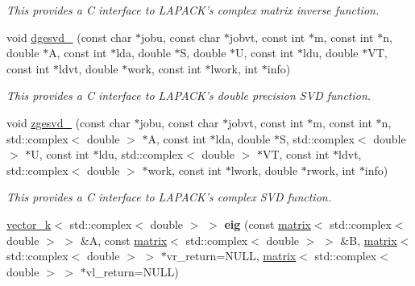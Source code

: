 \begin{DoxyCompactItemize}
\begin{DoxyCompactList}\small\item\em This provides a C interface to L\-A\-P\-A\-C\-K's complex matrix inverse function. \end{DoxyCompactList}\item 
\hypertarget{namespacekeycpp_a8fe7a71afbb6c5dc049cdd7afff6c0af}{void \hyperlink{namespacekeycpp_a8fe7a71afbb6c5dc049cdd7afff6c0af}{dgesvd\-\_\-} (const char $\ast$jobu, const char $\ast$jobvt, const int $\ast$m, const int $\ast$n, double $\ast$A, const int $\ast$lda, double $\ast$S, double $\ast$U, const int $\ast$ldu, double $\ast$V\-T, const int $\ast$ldvt, double $\ast$work, const int $\ast$lwork, int $\ast$info)}\label{namespacekeycpp_a8fe7a71afbb6c5dc049cdd7afff6c0af}

\begin{DoxyCompactList}\small\item\em This provides a C interface to L\-A\-P\-A\-C\-K's double precision S\-V\-D function. \end{DoxyCompactList}\item 
\hypertarget{namespacekeycpp_afa5e2f74110f53bd288c15ce1f183f9b}{void \hyperlink{namespacekeycpp_afa5e2f74110f53bd288c15ce1f183f9b}{zgesvd\-\_\-} (const char $\ast$jobu, const char $\ast$jobvt, const int $\ast$m, const int $\ast$n, std\-::complex$<$ double $>$ $\ast$A, const int $\ast$lda, double $\ast$S, std\-::complex$<$ double $>$ $\ast$U, const int $\ast$ldu, std\-::complex$<$ double $>$ $\ast$V\-T, const int $\ast$ldvt, std\-::complex$<$ double $>$ $\ast$work, const int $\ast$lwork, double $\ast$rwork, int $\ast$info)}\label{namespacekeycpp_afa5e2f74110f53bd288c15ce1f183f9b}

\begin{DoxyCompactList}\small\item\em This provides a C interface to L\-A\-P\-A\-C\-K's complex S\-V\-D function. \end{DoxyCompactList}\item 
\hypertarget{namespacekeycpp_ab08546b5ffdc4b792b2a835c823340cc}{\hyperlink{classkeycpp_1_1vector__k}{vector\-\_\-k}$<$ std\-::complex$<$ double $>$ $>$ {\bfseries eig} (const \hyperlink{classkeycpp_1_1matrix}{matrix}$<$ std\-::complex$<$ double $>$ $>$ \&A, const \hyperlink{classkeycpp_1_1matrix}{matrix}$<$ std\-::complex$<$ double $>$ $>$ \&B, \hyperlink{classkeycpp_1_1matrix}{matrix}$<$ std\-::complex$<$ double $>$ $>$ $\ast$vr\-\_\-return=N\-U\-L\-L, \hyperlink{classkeycpp_1_1matrix}{matrix}$<$ std\-::complex$<$ double $>$ $>$ $\ast$vl\-\_\-return=N\-U\-L\-L)}\label{namespacekeycpp_ab08546b5ffdc4b792b2a835c823340cc}


\end{DoxyCompactItemize}
